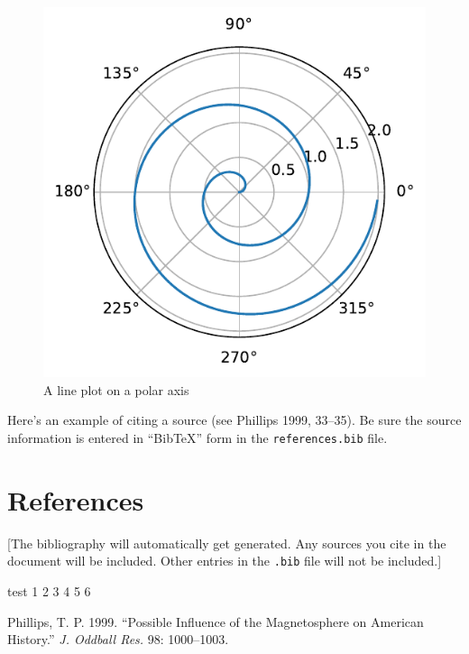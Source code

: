 \documentclass[
  letterpaper,
  DIV=11,
  numbers=noendperiod]{scrartcl}
\newlength{\cslhangindent}
\newlength{\cslentryspacingunit} %
\newenvironment{CSLReferences}[2] %
 {%
  \setlength{\parindent}{0pt}
  \ifodd #1
  \let\oldpar\par
  \def\par{\hangindent=\cslhangindent\oldpar}
  \fi
  \setlength{\parskip}{#2\cslentryspacingunit}
 }%
 {}
\begin{document}
\begin{figure}[H]

{\centering \includegraphics{proposal_files/figure-pdf/fig-polar-output-1.pdf}

}

\caption{\label{fig-polar}A line plot on a polar axis}

\end{figure}

Here's an example of citing a source (see Phillips 1999, 33--35). Be
sure the source information is entered in ``BibTeX'' form in the
\texttt{references.bib} file.

\hypertarget{references}{%
\section{References}\label{references}}

{[}The bibliography will automatically get generated. Any sources you
cite in the document will be included. Other entries in the
\texttt{.bib} file will not be included.{]}

test 1 2 3 4 5 6

\hypertarget{refs}{}
\begin{CSLReferences}{1}{0}
\leavevmode{}%
Phillips, T. P. 1999. {``Possible Influence of the Magnetosphere on
{American} History.''} \emph{J. Oddball Res.} 98: 1000--1003.

\end{CSLReferences}
\end{document}
